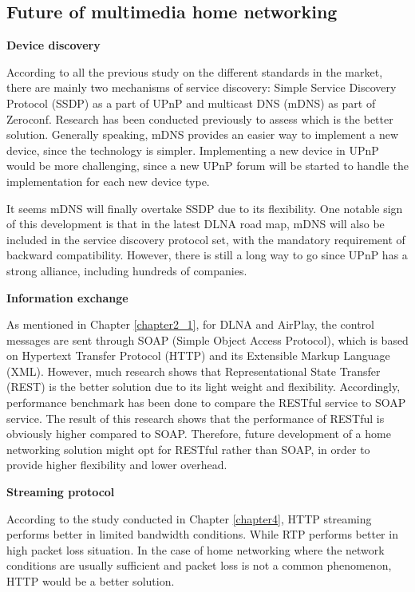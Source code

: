 \subsection{Future of multimedia home networking\label{5_3}}
\textbf{Device discovery}

According to all the previous study on the different standards in the market,
there are mainly two mechanisms of service discovery: Simple Service
Discovery Protocol (SSDP) as a part of UPnP and multicast DNS (mDNS) as part of
Zeroconf. Research \cite{zeroconf_vs_upnp} has been conducted previously to
assess which is the better solution. Generally speaking, mDNS provides an
easier way to implement a new device, since the technology is simpler.
Implementing a new device in UPnP would be more challenging, since a new UPnP
forum will be started to handle the implementation for each new device type.

It seems mDNS will finally overtake SSDP due to its flexibility. One notable
sign of this development is that in the latest DLNA road map, mDNS will also be
included in the service discovery protocol set, with the mandatory requirement
of backward compatibility. However, there is still a long way to go since UPnP
has a strong alliance, including hundreds of companies.

\textbf{Information exchange}

As mentioned in Chapter \ref{chapter2_1}, for DLNA and AirPlay, the control
messages are sent through SOAP (Simple Object Access Protocol), which is based on
Hypertext Transfer Protocol (HTTP) and its Extensible Markup Language (XML).
However, much research \cite{restful_webservice} shows that Representational
State Transfer (REST) is the better solution due to its light weight and
flexibility. Accordingly, performance benchmark \cite{performance_restful_saop}
has been done to compare the RESTful service to SOAP service. The result of this
research shows that the performance of RESTful is obviously higher compared to
SOAP. Therefore, future development of a home networking solution might opt for
RESTful rather than SOAP, in order to provide higher flexibility and lower
overhead.

\textbf{Streaming protocol}

According to the study conducted in Chapter \ref{chapter4}, HTTP streaming
performs better in limited bandwidth conditions. While RTP performs better in
high packet loss situation. In the case of home networking where the network
conditions are usually sufficient and packet loss is not a common phenomenon,
HTTP would be a better solution.

